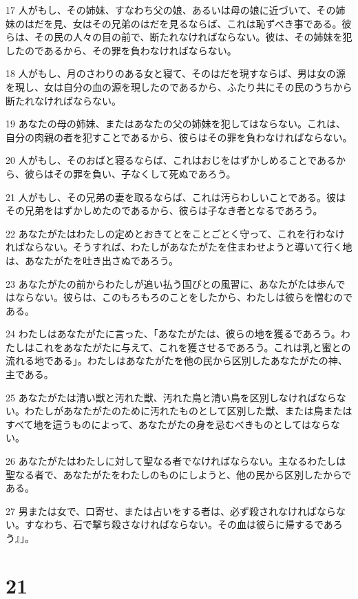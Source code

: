 \par 17 人がもし、その姉妹、すなわち父の娘、あるいは母の娘に近づいて、その姉妹のはだを見、女はその兄弟のはだを見るならば、これは恥ずべき事である。彼らは、その民の人々の目の前で、断たれなければならない。彼は、その姉妹を犯したのであるから、その罪を負わなければならない。
\par 18 人がもし、月のさわりのある女と寝て、そのはだを現すならば、男は女の源を現し、女は自分の血の源を現したのであるから、ふたり共にその民のうちから断たれなければならない。
\par 19 あなたの母の姉妹、またはあなたの父の姉妹を犯してはならない。これは、自分の肉親の者を犯すことであるから、彼らはその罪を負わなければならない。
\par 20 人がもし、そのおばと寝るならば、これはおじをはずかしめることであるから、彼らはその罪を負い、子なくして死ぬであろう。
\par 21 人がもし、その兄弟の妻を取るならば、これは汚らわしいことである。彼はその兄弟をはずかしめたのであるから、彼らは子なき者となるであろう。
\par 22 あなたがたはわたしの定めとおきてとをことごとく守って、これを行わなければならない。そうすれば、わたしがあなたがたを住まわせようと導いて行く地は、あなたがたを吐き出さぬであろう。
\par 23 あなたがたの前からわたしが追い払う国びとの風習に、あなたがたは歩んではならない。彼らは、このもろもろのことをしたから、わたしは彼らを憎むのである。
\par 24 わたしはあなたがたに言った、「あなたがたは、彼らの地を獲るであろう。わたしはこれをあなたがたに与えて、これを獲させるであろう。これは乳と蜜との流れる地である」。わたしはあなたがたを他の民から区別したあなたがたの神、主である。
\par 25 あなたがたは清い獣と汚れた獣、汚れた鳥と清い鳥を区別しなければならない。わたしがあなたがたのために汚れたものとして区別した獣、または鳥またはすべて地を這うものによって、あなたがたの身を忌むべきものとしてはならない。
\par 26 あなたがたはわたしに対して聖なる者でなければならない。主なるわたしは聖なる者で、あなたがたをわたしのものにしようと、他の民から区別したからである。
\par 27 男または女で、口寄せ、または占いをする者は、必ず殺されなければならない。すなわち、石で撃ち殺さなければならない。その血は彼らに帰するであろう』」。

\chapter{21}

